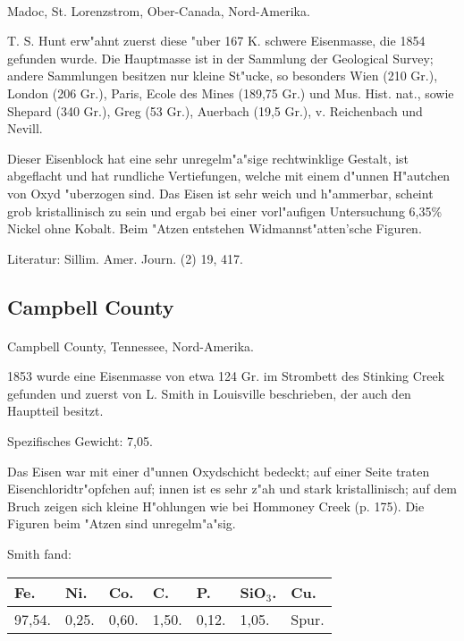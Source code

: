 \documentclass[a4paper, 11pt, oneside]{article}
\begin{document}
\paragraph{}
Madoc, St. Lorenzstrom, Ober-Canada, Nord-Amerika.

T. S. Hunt erw"ahnt zuerst diese "uber 167 K. schwere Eisenmasse, die 1854 gefunden wurde. Die Hauptmasse ist in der Sammlung der Geological Survey; andere Sammlungen besitzen nur kleine St"ucke, so besonders Wien (210 Gr.), London (206 Gr.), Paris, Ecole des Mines (189,75 Gr.) und Mus. Hist. nat., sowie Shepard (340 Gr.), Greg (53 Gr.), Auerbach (19,5 Gr.), v. Reichenbach und Nevill.

Dieser Eisenblock hat eine sehr unregelm"a"sige rechtwinklige Gestalt, ist abgeflacht und hat rundliche Vertiefungen, welche mit einem d"unnen H"autchen von Oxyd "uberzogen sind. Das Eisen ist sehr weich und h"ammerbar, scheint grob kristallinisch zu sein und ergab bei einer vorl"aufigen Untersuchung 6,35\% Nickel ohne Kobalt. Beim "Atzen entstehen Widmannst"atten'sche Figuren.

\footnotesize
Literatur: Sillim. Amer. Journ. (2) 19, 417.

\subsection{Campbell County}
\normalsize
\paragraph{}
Campbell County, Tennessee, Nord-Amerika.

1853 wurde eine Eisenmasse von etwa 124 Gr. im Strombett des Stinking Creek gefunden und zuerst von L. Smith in Louisville beschrieben, der auch den Hauptteil besitzt.

Spezifisches Gewicht: 7,05.

Das Eisen war mit einer d"unnen Oxydschicht bedeckt; auf einer Seite traten Eisenchloridtr"opfchen auf; innen ist es sehr z"ah und stark kristallinisch; auf dem Bruch zeigen sich kleine H"ohlungen wie bei Hommoney Creek (p. 175). Die Figuren beim "Atzen sind unregelm"a"sig.

Smith fand:
\begin{table}[H]
    \centering
    \begin{tabular}{l l l l l l l}
        Fe. & Ni. & Co. & C. & P. & SiO$_{3}$. & Cu. \\ \hline
        97,54. & 0,25. & 0,60. & 1,50. & 0,12. & 1,05. & Spur. \\
    \end{tabular}
\end{table}
\end{document}
